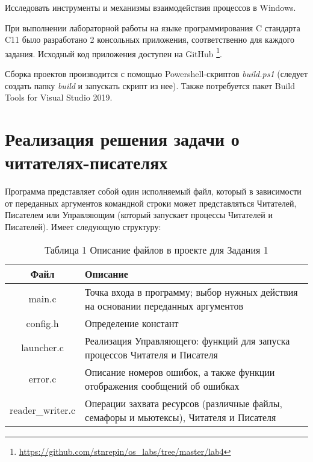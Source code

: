 \documentclass[a4paper,14pt]{extarticle}
\newcommand{\Code}[1]{\textit{#1}}
\begin{document}


\renewcommand*{\thepage}{}
\tableofcontents
\clearpage
\renewcommand*{\thepage}{\arabic{page}}

\setcounter{page}{3}


Исследовать инструменты и механизмы взаимодействия процессов в Windows.


При выполнении лабораторной работы на языке программирования C стандарта C11
было разработано 2 консольных приложения, соответственно для каждого задания.
Исходный код приложения доступен на GitHub
\footnote{\url{https://github.com/stnrepin/os_labs/tree/master/lab4}}.

Сборка проектов производится с помощью Powershell-скриптов \Code{build.ps1}
(следует создать папку \Code{build} и запускать скрипт из нее). Также
потребуется пакет Build Tools for Visual Studio 2019.


\section{Реализация решения задачи о читателях-писателях}

Программа представляет собой один исполняемый файл, который в зависимости от
переданных аргументов командной строки может представляться Читателей, Писателем или Управляющим
(который запускает процессы Читателей и Писателей). Имеет следующую структуру:

\begin{table}[H]
    \centering
    \begin{tabularx}{\textwidth}{|c|X|}
        \hline
        Файл & Описание \\
        \hline
        main.c & Точка входа в программу; выбор нужных действия на основании
                    переданных аргументов \\
        \hline
        config.h & Определение констант \\
        \hline
        launcher.c & Реализация Управляющего: функций для запуска процессов
        Читателя и Писателя \\
        \hline
        error.c & Описание номеров ошибок, а также функции отображения
                    сообщений об ошибках \\
        \hline
        reader\_writer.c & Операции захвата ресурсов (различные файлы, семафоры
        и мьютексы), Читателя и Писателя \\
        \hline
    \end{tabularx}
    \caption*{Таблица 1 Описание файлов в проекте для Задания 1}
\end{table}
\end{document}
